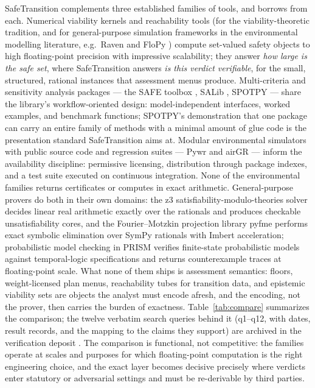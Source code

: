 \documentclass[3p,11pt]{elsarticle}
\begin{document}
SafeTransition complements three established families of tools, and borrows
from each. Numerical viability kernels and reachability tools (for the
viability-theoretic tradition, and for general-purpose simulation frameworks
in the environmental modelling literature, e.g.\ Raven
\citep{Craig2020} and FloPy \citep{Bakker2016}) compute set-valued safety
objects to high floating-point precision with impressive scalability; they
answer \emph{how large is the safe set}, where SafeTransition answers
\emph{is this verdict verifiable}, for the small, structured, rational
instances that assessment menus produce. Multi-criteria and sensitivity
analysis packages --- the SAFE toolbox \citep{Pianosi2015}, SALib
\citep{Herman2017}, SPOTPY \citep{Houska2015} --- share the library's
workflow-oriented design: model-independent interfaces, worked examples,
and benchmark functions; SPOTPY's demonstration that one package can carry
an entire family of methods with a minimal amount of glue code is the
presentation standard SafeTransition aims at. Modular environmental
simulators with public source code and regression suites --- Pywr
\citep{Tomlinson2020} and airGR \citep{Coron2017} --- inform the
availability discipline: permissive licensing, distribution through package
indexes, and a test suite executed on continuous integration. None of the environmental
families returns certificates or computes in exact arithmetic. General-purpose
provers do both in their own domains: the z3 satisfiability-modulo-theories
solver \citep{deMoura2008} decides linear real arithmetic exactly over the
rationals and produces checkable unsatisfiability cores, and the Fourier--Motzkin
projection library pyfme \citep{Caron2022} performs exact symbolic
elimination over SymPy rationals with Imbert acceleration; probabilistic
model checking in PRISM \citep{Kwiatkowska2011} verifies finite-state
probabilistic models against temporal-logic specifications and returns
counterexample traces at floating-point scale. What none of them ships is
assessment semantics: floors, weight-licensed plan menus, reachability tubes
for transition data, and epistemic viability sets are objects the analyst
must encode afresh, and the encoding, not the prover, then carries the
burden of exactness. Table~\ref{tab:compare} summarizes the comparison; the
twelve verbatim search queries behind it (q1--q12, with dates, result
records, and the mapping to the claims they support) are archived in the
verification deposit \citep{Deposit2026}. The comparison is functional, not
competitive: the families operate at scales and purposes for which
floating-point computation is the right engineering choice, and the exact
layer becomes decisive precisely where verdicts enter statutory or
adversarial settings and must be re-derivable by third parties.
\end{document}
